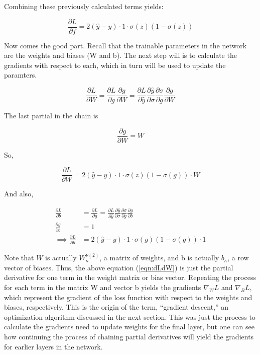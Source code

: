 \noindent Combining these previously calculated terms yields:

\begin{equation}
\frac{\partial L}{\partial f} = 2(\hat{y} - y ) \cdot 1 \cdot  \sigma(z)(1 - \sigma(z))
\end{equation}

Now comes the good part. Recall that the trainable parameters in the network are the weights and biases (W and b). The next step will is to calculate the gradients with respect to each, which in turn will be used to update the paramters.

\begin{equation}
\frac{\partial L}{\partial W} = \frac{\partial L}{\partial g}\frac{\partial g}{\partial W} = \frac{\partial L}{\partial \hat{y}} \frac{\partial \hat{y}}{\partial \sigma} \frac{\partial \sigma}{\partial g} \frac{\partial g}{\partial W}
\end{equation}

\noindent The last partial in the chain is

\begin{equation}
\frac{\partial g}{\partial W} = W
\end{equation}

So,

\begin{equation}
\frac{\partial L}{\partial W} = 2(\hat{y} - y ) \cdot 1 \cdot  \sigma(z)(1 - \sigma(g)) \cdot W
\end{equation}

And also,

\begin{align}
\label{eqn:dLdW}
\frac{\partial L}{\partial b} &= \frac{\partial L}{\partial g} = \frac{\partial L}{\partial \hat{y}} \frac{\partial \hat{y}}{\partial \sigma} \frac{\partial \sigma}{\partial g} \frac{\partial g}{\partial b} \\
\frac{\partial g}{\partial b} &= 1 \\
\implies \frac{\partial L}{\partial b} &= 2(\hat{y} - y ) \cdot 1 \cdot  \sigma(g)(1 - \sigma(g)) \cdot 1
\end{align}

Note that $ W $ is actually $ W_\kappa ^{\nu (2)} $, a matrix of weights, and b is actually $ b_\kappa $, a row vector of biases. Thus, the above equation (\ref{eqn:dLdW}) is just the partial derivative for one term in the weight matrix or bias vector. Repeating the process for each term in the matrix W and vector b yields the gradients $ \nabla_W L $  and $ \nabla_BL $, which represent the gradient of the loss function with respect to the weights and biases, respectively. This is the origin of the term, ``gradient descent,'' an optimization algorithm discussed in the next section. This was just the process to calculate the gradients need to update weights for the final layer, but one can see how continuing the process of chaining partial derivatives will yield the gradients for earlier layers in the network.

